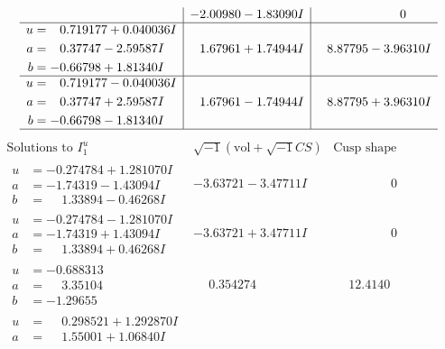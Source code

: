 \documentclass[1p]{elsarticle_modified}
\theoremstyle{definition}
\newcommand{\I}{\sqrt{-1}}
\begin{document}
$$\begin{array}{c|c|c}
 & -2.00980 - 1.83090 I & \phantom{-0.000000 } 0 \\ \hline\begin{aligned}
u &= \phantom{-}0.719177 + 0.040036 I \\
a &= \phantom{-}0.37747 - 2.59587 I \\
b &= -0.66798 + 1.81340 I\end{aligned}
 & \phantom{-}1.67961 + 1.74944 I & \phantom{-}8.87795 - 3.96310 I \\ \hline\begin{aligned}
u &= \phantom{-}0.719177 - 0.040036 I \\
a &= \phantom{-}0.37747 + 2.59587 I \\
b &= -0.66798 - 1.81340 I\end{aligned}
 & \phantom{-}1.67961 - 1.74944 I & \phantom{-}8.87795 + 3.96310 I\\
 \hline 
 \end{array}$$\newpage$$\begin{array}{c|c|c}  
\text{Solutions to }I^u_{1}& \I (\text{vol} + \sqrt{-1}CS) & \text{Cusp shape}\\
 \hline 
\begin{aligned}
u &= -0.274784 + 1.281070 I \\
a &= -1.74319 - 1.43094 I \\
b &= \phantom{-}1.33894 - 0.46268 I\end{aligned}
 & -3.63721 - 3.47711 I & \phantom{-0.000000 } 0 \\ \hline\begin{aligned}
u &= -0.274784 - 1.281070 I \\
a &= -1.74319 + 1.43094 I \\
b &= \phantom{-}1.33894 + 0.46268 I\end{aligned}
 & -3.63721 + 3.47711 I & \phantom{-0.000000 } 0 \\ \hline\begin{aligned}
u &= -0.688313\phantom{ +0.000000I} \\
a &= \phantom{-}3.35104\phantom{ +0.000000I} \\
b &= -1.29655\phantom{ +0.000000I}\end{aligned}
 & \phantom{-}0.354274\phantom{ +0.000000I} & \phantom{-}12.4140\phantom{ +0.000000I} \\ \hline\begin{aligned}
u &= \phantom{-}0.298521 + 1.292870 I \\
a &= \phantom{-}1.55001 + 1.06840 I \\

\end{aligned}
\end{array}$$
\end{document}
